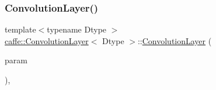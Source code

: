 \subsubsection{\texorpdfstring{Convolution\+Layer()}{ConvolutionLayer()}\hspace{0.1cm}{\footnotesize\ttfamily [2/2]}}
{\footnotesize\ttfamily template$<$typename Dtype $>$ \\
\mbox{\hyperlink{classcaffe_1_1_convolution_layer}{caffe\+::\+Convolution\+Layer}}$<$ Dtype $>$\+::\mbox{\hyperlink{classcaffe_1_1_convolution_layer}{Convolution\+Layer}} (\begin{DoxyParamCaption}\item[{const \mbox{\hyperlink{classcaffe_1_1_layer_parameter}{Layer\+Parameter}} \&}]{param }\end{DoxyParamCaption})\hspace{0.3cm}{\ttfamily [inline]}, {\ttfamily [explicit]}}


